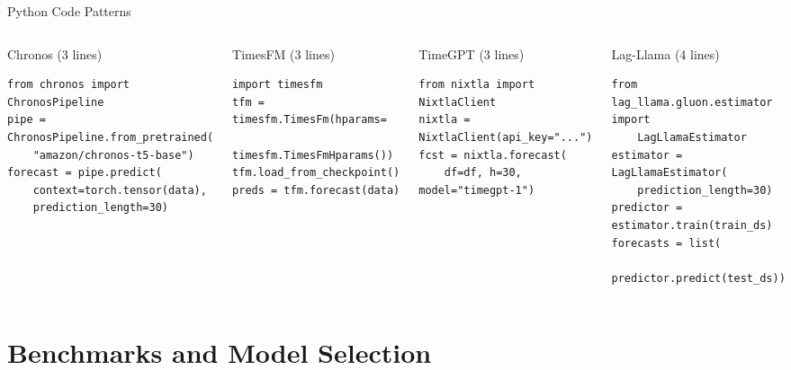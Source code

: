 \documentclass[9pt, aspectratio=169, t]{beamer}
\begin{document}
\begin{frame}[fragile]{Python Code Patterns}
    \begin{cminipage}{0.95\textwidth}
    \vspace{-3mm}
    {\scriptsize
    \begin{columns}[T]
        \begin{block}{Chronos (3 lines)}
            \begin{verbatim}
from chronos import ChronosPipeline
pipe = ChronosPipeline.from_pretrained(
    "amazon/chronos-t5-base")
forecast = pipe.predict(
    context=torch.tensor(data),
    prediction_length=30)
            \end{verbatim}
        \end{block}
        \vspace{-3mm}
        \begin{block}{TimesFM (3 lines)}
            \begin{verbatim}
import timesfm
tfm = timesfm.TimesFm(hparams=
    timesfm.TimesFmHparams())
tfm.load_from_checkpoint()
preds = tfm.forecast(data)
            \end{verbatim}
        \end{block}

        \begin{block}{TimeGPT (3 lines)}
            \begin{verbatim}
from nixtla import NixtlaClient
nixtla = NixtlaClient(api_key="...")
fcst = nixtla.forecast(
    df=df, h=30, model="timegpt-1")
            \end{verbatim}
        \end{block}
        \vspace{-3mm}
        \begin{block}{Lag-Llama (4 lines)}
            \begin{verbatim}
from lag_llama.gluon.estimator import
    LagLlamaEstimator
estimator = LagLlamaEstimator(
    prediction_length=30)
predictor = estimator.train(train_ds)
forecasts = list(
    predictor.predict(test_ds))
            \end{verbatim}
        \end{block}
    \end{columns}
    }
    \end{cminipage}
\end{frame}

\section{Benchmarks and Model Selection}
\end{document}
